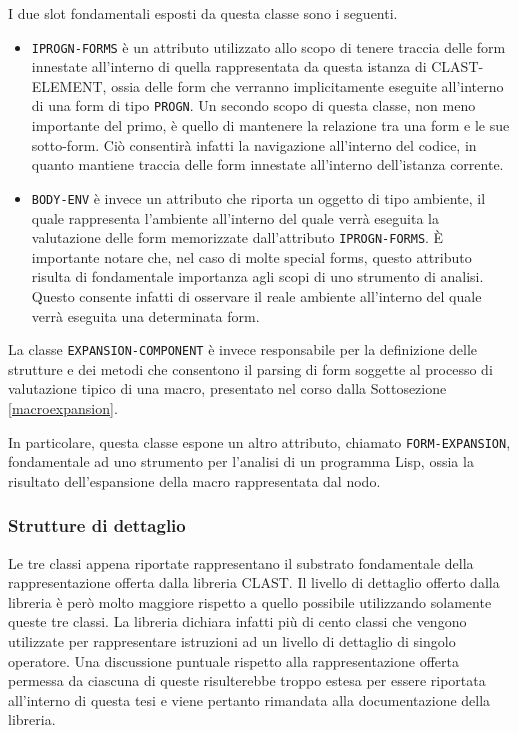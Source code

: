 I due slot fondamentali esposti da questa classe sono i seguenti.

\begin{itemize}

\item \texttt{IPROGN-FORMS} è un attributo utilizzato allo scopo di tenere
traccia delle form innestate all’interno di quella rappresentata da questa
istanza di CLAST-ELEMENT, ossia delle form che verranno implicitamente
eseguite all’interno di una form di tipo \texttt{PROGN}. Un secondo scopo di
questa classe, non meno importante del primo, è quello di mantenere la
relazione tra una form e le sue sotto-form. Ciò consentirà infatti la
navigazione all'interno del codice, in quanto mantiene traccia delle form
innestate all'interno dell'istanza corrente.

\item \texttt{BODY-ENV} è invece un attributo che riporta un oggetto di tipo
ambiente, il quale rappresenta l'ambiente all’interno del quale verrà eseguita
la valutazione delle form memorizzate dall’attributo \texttt {IPROGN-FORMS}. È
importante notare che, nel caso di molte special forms, questo attributo risulta
di fondamentale importanza agli scopi di uno strumento di analisi. Questo
consente infatti di osservare il reale ambiente all'interno del quale verrà
eseguita una determinata form.

\end{itemize}

La classe \texttt{EXPANSION-COMPONENT} è invece responsabile per la
definizione delle strutture e dei metodi che consentono il parsing di form
soggette al processo di valutazione tipico di una macro, presentato nel corso
dalla Sottosezione \ref{macroexpansion}.

In particolare, questa classe espone un altro attributo, chiamato \texttt
{FORM-EXPANSION}, fondamentale ad uno strumento per l’analisi di un programma
Lisp, ossia la risultato dell’espansione della macro rappresentata dal nodo.\\

\subsubsection{Strutture di dettaglio}

Le tre classi appena riportate rappresentano il substrato fondamentale della
rappresentazione offerta dalla libreria CLAST. Il livello di dettaglio offerto
dalla libreria è però molto maggiore rispetto a quello possibile utilizzando
solamente queste tre classi. La libreria dichiara infatti più di cento classi
che vengono utilizzate per rappresentare istruzioni ad un livello di dettaglio
di singolo operatore. Una discussione puntuale rispetto alla rappresentazione
offerta permessa da ciascuna di queste risulterebbe troppo estesa per essere
riportata all’interno di questa tesi e viene pertanto rimandata alla
documentazione della libreria.\\

